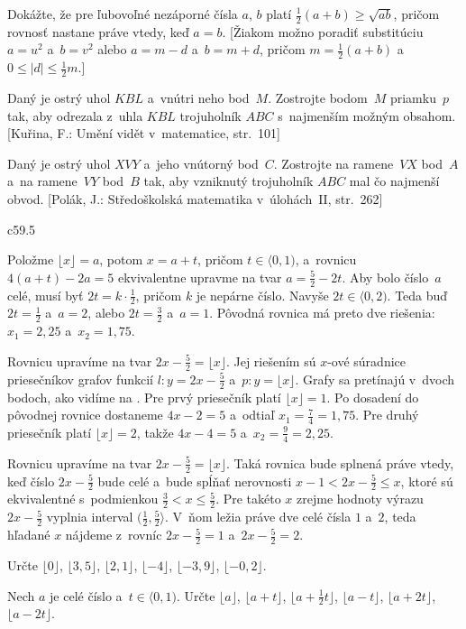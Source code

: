 {Dokážte, že pre ľubovoľné nezáporné čísla $a$, $b$ platí $\frac12(a+b)\ge\sqrt{ab}$,
pričom rovnosť nastane práve vtedy, keď $a=b$.
[Žiakom možno poradiť substitúciu $a=u^2$ a~$b=v^2$ alebo $a=m-d$ a~$b=m+d$, pričom $m=\frac12(a+b)$
a~$0\le|d|\le \frac12m$.]

\D
Daný je ostrý uhol $KBL$ a~vnútri neho bod~$M$. Zostrojte bodom~$M$ priamku~$p$ tak, aby odrezala z~uhla
$KBL$ trojuholník $ABC$ s~najmenším možným obsahom. [Kuřina, F.: Umění vidět v~matematice, str.~101]

Daný je ostrý uhol $XVY$ a~jeho vnútorný bod~$C$. Zostrojte na ramene~$VX$ bod~$A$ a~na ramene~$VY$ bod~$B$
tak, aby vzniknutý trojuholník $ABC$ mal čo najmenší obvod.
[Polák, J.: Středoškolská matematika v~úlohách~II, str.~262]
}

{%
\epsplace c59.5 \hfil\Obr

Položme $\lfloor x\rfloor=a$, potom $x=a+t$, pričom $t\in\langle 0,1)$, a~rovnicu
$4(a+t)-2a=5$ ekvivalentne upravme na
tvar $a=\frac52-2t$. Aby bolo číslo~$a$ celé, musí byť $2t=k\cdot\frac12$, pričom $k$
je nepárne číslo. Navyše $2t\in\langle 0,2)$. Teda buď $2t =\frac12$ a~$a = 2$, alebo
$2t =\frac32$ a~$a=1$. Pôvodná rovnica má preto dve riešenia: $x_1=2{,}25$ a~$x_2=1{,}75$.

\ineriesenie
Rovnicu upravíme na tvar $2x-\frac 52=\lfloor x\rfloor$. Jej riešením
sú $x$-ové súradnice priesečníkov grafov funkcií $l\colon y= 2x-\frac52$
a~$p\colon y=\lfloor x\rfloor$. Grafy sa pretínajú v~dvoch bodoch, ako vidíme na \obr.
Pre prvý priesečník platí $\lfloor x\rfloor=1$. Po dosadení do pôvodnej rovnice
dostaneme $4x-2=5$ a~odtiaľ  $x_1=\frac74=1{,}75$. Pre druhý
priesečník platí $\lfloor x\rfloor= 2$, takže $4x-4=5$ a~$x_2=\frac94=2{,}25$.

\inspicture

\ineriesenie
Rovnicu upravíme na tvar $2x-\frac 52  =\lfloor x\rfloor$. Taká rovnica bude
splnená práve vtedy, keď číslo $2x-\frac52$ bude celé a~bude spĺňať nerovnosti
$x-1<2x-\frac52\le x$, ktoré sú ekvivalentné s~podmienkou $\frac32<x\le\frac52$. Pre takéto $x$
zrejme hodnoty výrazu $2x-\frac52$ vyplnia interval
$(\frac12,\frac52\rangle$. V~ňom ležia práve dve celé čísla $1$ a~$2$, teda
hľadané $x$ nájdeme z~rovníc $2x-\frac52=1$ a~$2x-\frac52=2$.


Určte $\lfloor 0\rfloor$, $\lfloor 3{,}5\rfloor$, $\lfloor 2{,}1\rfloor$, $\lfloor -4\rfloor$,
$\lfloor -3{,}9\rfloor$, $\lfloor -0{,}2\rfloor$.

Nech $a$ je celé číslo a~$t\in\langle 0,1)$. Určte $\lfloor a\rfloor$, $\lfloor a+t\rfloor$,
$\lfloor a+\frac12t\rfloor$, $\lfloor a-t\rfloor$, $\lfloor a+2t\rfloor$, $\lfloor a-2t\rfloor$.

}
